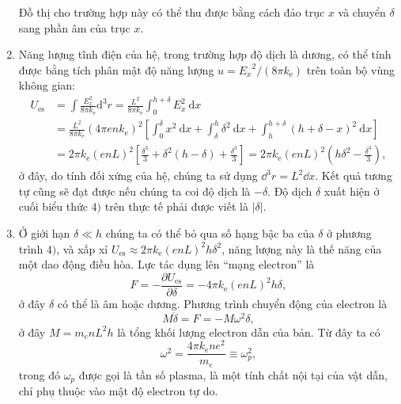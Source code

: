 \begin{loigiai}
\begin{enumerate}[1)]
Đồ thị cho trường hợp này có thể thu được bằng cách đảo trục $x$ và chuyển $\delta$ sang phần âm của trục $x$.
\item Năng lượng tĩnh điện của hệ, trong trường hợp độ dịch là dương, có thể tính được bằng tích phân mật độ năng lượng $u={E_x}^2/(8\pi k_{\mathrm{e}})$ trên toàn bộ vùng không gian:
 \[\begin{aligned}
U_{\mathrm{es}} &=\int \frac{E_{x}^{2}}{8 \pi k_{\mathrm{e}}} \mathrm{d}^{3} r=\frac{L^{2}}{8 \pi k_{\mathrm{e}}} \int_{0}^{h+\delta} E_{x}^{2} \mathrm{~d} x \\
&=\frac{L^{2}}{8 \pi k_{\mathrm{e}}}(4 \pi e n k_{\mathrm{e}})^{2}\left[\int_{0}^{\delta} x^{2} \mathrm{~d} x+\int_{\delta}^{h} \delta^{2} \mathrm{~d} x+\int_{h}^{h+\delta}(h+\delta-x)^{2} \mathrm{~d} x\right] \\
&=2 \pi k_{\mathrm{e}}(e n L)^{2}\left[\frac{\delta^{3}}{3}+\delta^{2}(h-\delta)+\frac{\delta^{3}}{3}\right]=2 \pi k_{\mathrm{e}}(e n L)^{2}\left(h \delta^{2}-\frac{\delta^{3}}{3}\right),
\end{aligned} \tag{4} \]
ở đây, do tính đối xứng của hệ, chúng ta sử dụng $\dd^3 r = L^2 \dd x $. Kết quả tương tự cũng sẽ đạt được nếu chúng ta coi độ dịch là $-\delta$. Độ dịch $\delta$ xuất hiện ở cuối biểu thức $4)$ trên thực tế phải được viết là $|\delta|$.
\item Ở giới hạn $\delta \ll h$ chúng ta có thể bỏ qua số hạng bậc ba của $\delta$ ở phương trình $4)$, và xấp xỉ $U_{\mathrm{es}} \approx 2\pi k_{\mathrm{e}} (enL)^2 h \delta^2$, năng lượng này là thế năng của một dao động điều hòa. Lực tác dụng lên ``mạng electron'' là 
   \[F= - \frac{\partial U_{\mathrm{es}}}{\partial \delta} = - 4 \pi k_{\mathrm{e}} (enL)^2h\delta, \tag{5}\]
ở đây $\delta$ có thể là âm hoặc dương. Phương trình chuyển động của electron là 
   \[M\ddot{\delta} = F = -M\omega^2\delta, \tag{6}\]
ở đây $M= m_e nL^2h$ là tổng khối lượng electron dẫn của bản. Từ đây ta có
     \[\omega^2 = \frac{4\pi k_{\mathrm{e}} n e^2}{m_e} \equiv \omega_p^2, \tag{7}\]
trong đó $\omega_p$ được gọi là tần số plasma, là một tính chất nội tại của vật dẫn, chỉ phụ thuộc vào mật độ electron tự do.
\end{enumerate}
\end{loigiai}


